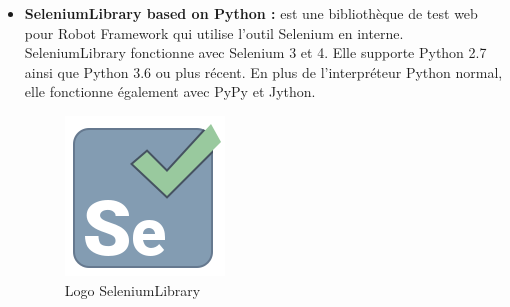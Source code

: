 \begin{itemize}
	\item \textbf{SeleniumLibrary based on Python\cite{seleniumlib} :} est une bibliothèque de test web pour Robot Framework qui utilise l'outil Selenium en interne. SeleniumLibrary fonctionne avec Selenium 3 et 4. Elle supporte Python 2.7 ainsi que Python 3.6 ou plus récent. En plus de l'interpréteur Python normal, elle fonctionne également avec PyPy et Jython.
	\begin{figure}[H]
		\centering
		\includegraphics[width=0.08\linewidth]{img/logos/selenium}
		\caption[Logo SeleniumLibrary]{Logo SeleniumLibrary}
		\label{fig:selenium}
	\end{figure}


\end{itemize}
